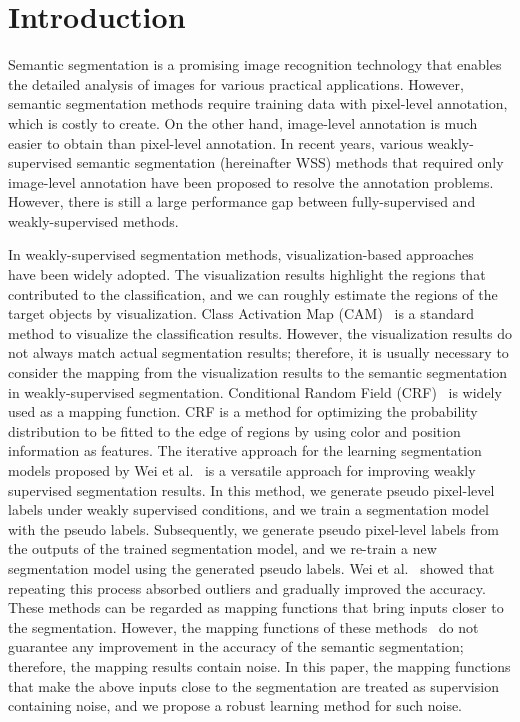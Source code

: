 \documentclass[10pt,twocolumn,letterpaper]{article}
\begin{document}
\section{Introduction}
Semantic segmentation is a promising image recognition technology
that enables the detailed analysis of images for various practical applications. 
However, semantic segmentation methods require training data with pixel-level annotation, which is costly to create.
On the other hand, image-level annotation is much easier to obtain than pixel-level annotation.
In recent years, various weakly-supervised semantic segmentation (hereinafter WSS) methods that required only image-level annotation have been proposed to resolve the annotation problems. 
However, there is still a large performance gap between fully-supervised and weakly-supervised methods.

In weakly-supervised segmentation methods, visualization-based approaches~\cite{zei11, sim14, gap} have been widely adopted.
The visualization results highlight the regions that contributed to 
the classification, and we can roughly estimate the regions of the target objects by visualization.
Class Activation Map (CAM)~\cite{gap} is a standard method to visualize the classification results.
However, the visualization results do not always match actual segmentation results; therefore, it is usually necessary to consider the mapping from the visualization results to the semantic segmentation in weakly-supervised segmentation.
Conditional Random Field (CRF)~\cite{kra11}
is widely used as a mapping function.
CRF is a method for optimizing the probability distribution to be fitted to the edge of regions by using color and position information as features.
The iterative approach for the learning segmentation models proposed by Wei et al.~\cite{stc} is a versatile approach for improving weakly supervised segmentation results. 
In this method, we generate pseudo pixel-level labels under weakly supervised conditions, and we train a segmentation model with the pseudo labels. 
Subsequently, we generate pseudo pixel-level labels from the outputs of the trained segmentation model, and we re-train a new segmentation model using the generated pseudo labels. Wei et al.~\cite{stc} showed that repeating this process absorbed outliers and gradually improved the accuracy.
These methods can be regarded as mapping functions that bring inputs closer to the segmentation.
However, the mapping functions of these methods~\cite{kra11, stc} do not guarantee any improvement in the accuracy of the semantic segmentation; therefore, the mapping results contain noise.
In this paper, the mapping functions that make the above inputs close to the segmentation are treated as supervision containing noise, and we propose a robust learning method for such noise.
\end{document}
